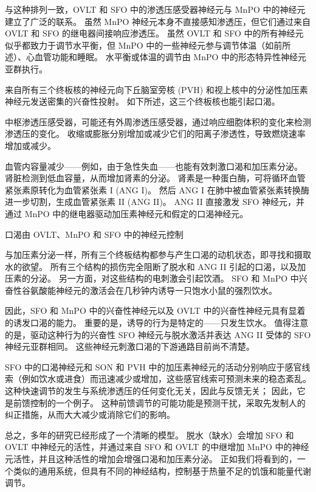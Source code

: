 与这种排列一致，OVLT 和 SFO 中的渗透压感受器神经元与 MnPO 中的神经元建立了广泛的联系。
虽然 MnPO 神经元本身不直接感知渗透压，但它们通过来自 OVLT 和 SFO 的继电器间接响应渗透压。
虽然 OVLT 和 SFO 中的所有神经元似乎都致力于调节水平衡，但 MnPO 中的一些神经元参与调节体温（如前所述）、心血管功能和睡眠。
水平衡或体温的调节由 MnPO 中的形态特异性神经元亚群执行。


来自所有三个终板核的神经元向下丘脑室旁核 (PVH) 和视上核中的分泌性加压素神经元发送密集的兴奋性投射。
如下所述，这三个终板核也能引起口渴。


中枢渗透压感受器，可能还有外周渗透压感受器，通过响应细胞体积的变化来检测渗透压的变化。
收缩或膨胀分别增加或减少它们的阳离子渗透性，导致燃烧速率增加或减少。


血管内容量减少——例如，由于急性失血——也能有效刺激口渴和加压素分泌。
肾脏检测到低血容量，从而增加肾素的分泌。
肾素是一种蛋白酶，可将循环血管紧张素原转化为血管紧张素 I (ANG I)。
然后 ANG I 在肺中被血管紧张素转换酶进一步切割，生成血管紧张素 II (ANG II)。
ANG II 直接激发 SFO 神经元，并通过 MnPO 中的继电器驱动加压素神经元和假定的口渴神经元。


口渴由 OVLT、MnPO 和 SFO 中的神经元控制

与加压素分泌一样，所有三个终板结构都参与产生口渴的动机状态，即寻找和摄取水的欲望。
所有三个结构的损伤完全阻断了脱水和 ANG II 引起的口渴，以及加压素的分泌。 另一方面，对这些结构的电刺激会引起饮酒。
SFO 和 MnPO 中兴奋性谷氨酸能神经元的激活会在几秒钟内诱导一只饱水小鼠的强烈饮水。


因此，SFO 和 MnPO 中的兴奋性神经元以及 OVLT 中的兴奋性神经元具有显着的诱发口渴的能力。
重要的是，诱导的行为是特定的——只发生饮水。
值得注意的是，驱动这种行为的兴奋性 SFO 神经元与脱水激活并表达 ANG II 受体的 SFO 神经元亚群相同。
这些神经元刺激口渴的下游通路目前尚不清楚。


SFO 中的口渴神经元和 SON 和 PVH 中的加压素神经元的活动分别响应于感官线索（例如饮水或进食）而迅速减少或增加，这些感官线索可预测未来的稳态紊乱。
这种快速调节的发生与系统渗透压的任何变化无关，因此与反馈无关；
因此，它是前馈控制的一个例子。
这种前馈调节的可能功能是预测干扰，采取先发制人的纠正措施，从而大大减少或消除它们的影响。


总之，多年的研究已经形成了一个清晰的模型。
脱水（缺水）会增加 SFO 和 OVLT 中神经元的活性，并通过来自 SFO 和 OVLT 的中继增加 MnPO 中的神经元活性，并且这种活性的增加会增强口渴和加压素分泌。
正如我们将看到的，一个类似的通用系统，但具有不同的神经结构，控制基于热量不足的饥饿和能量代谢调节。



